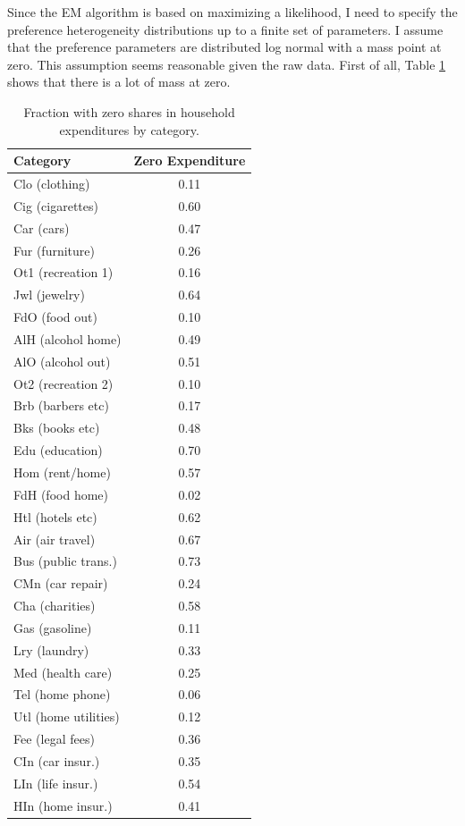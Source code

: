 \documentclass[12pt]{article}
\begin{document}
Since the EM algorithm is based on maximizing a likelihood, I need to specify the preference heterogeneity distributions up to a finite set of parameters.
I assume that the preference parameters are distributed log normal with a mass point at zero.
This assumption seems reasonable given the raw data.
First of all, Table \ref{tab:sharetab} shows that there is a lot of mass at zero.
\begin{table}
	\begin{center}
\begin{tabular}{|l|c|}
	\hline
\textbf{Category} & \textbf{Zero Expenditure} \\
	\hline
Clo (clothing) & 0.11 \\ 
	\hline
Cig (cigarettes) & 0.60 \\ 
	\hline
Car (cars) & 0.47 \\ 
	\hline
Fur (furniture) & 0.26 \\ 
	\hline
Ot1 (recreation 1) & 0.16 \\ 
	\hline
Jwl (jewelry) & 0.64 \\ 
	\hline
FdO (food out) & 0.10 \\ 
	\hline
AlH (alcohol home) & 0.49 \\ 
	\hline
AlO (alcohol out) & 0.51 \\ 
	\hline
Ot2 (recreation 2) & 0.10 \\ 
	\hline
Brb (barbers etc) & 0.17 \\ 
	\hline
Bks (books etc) & 0.48 \\ 
	\hline
Edu (education) & 0.70 \\ 
	\hline
Hom (rent/home) & 0.57 \\ 
	\hline
FdH (food home) & 0.02 \\ 
	\hline
Htl (hotels etc) & 0.62 \\ 
	\hline
Air (air travel) & 0.67 \\ 
	\hline
Bus (public trans.) & 0.73 \\ 
	\hline
CMn (car repair) & 0.24 \\ 
	\hline
Cha (charities) & 0.58 \\ 
	\hline
Gas (gasoline) & 0.11 \\ 
	\hline
Lry (laundry) & 0.33 \\ 
	\hline
Med (health care) & 0.25 \\ 
	\hline
Tel (home phone) & 0.06 \\ 
	\hline
Utl (home utilities) & 0.12 \\ 
	\hline
Fee (legal fees) & 0.36 \\ 
	\hline
CIn (car insur.) & 0.35 \\ 
	\hline
LIn (life insur.) & 0.54 \\ 
	\hline
HIn (home insur.) & 0.41 \\ 
	\hline
\end{tabular}
\end{center}
\label{tab:sharetab}
\caption{Fraction with zero shares in household expenditures by category.}
\vspace{-2in}
\end{table}
\end{document}
